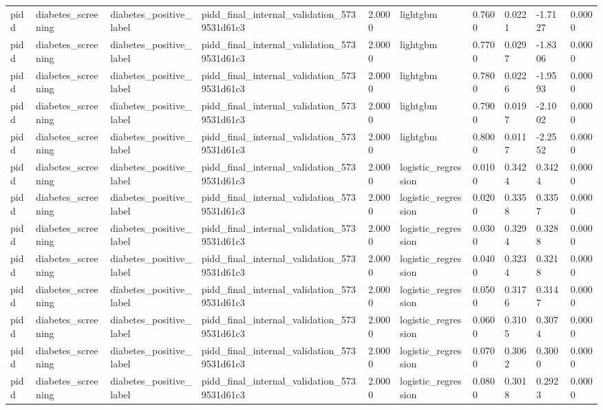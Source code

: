 \begin{tabular}{llllllllll}
pidd & diabetes\_screening & diabetes\_positive\_label & pidd\_final\_internal\_validation\_5739531d61c3 & 2.0000 & lightgbm & 0.7600 & 0.0221 & -1.7127 & 0.0000 \\
pidd & diabetes\_screening & diabetes\_positive\_label & pidd\_final\_internal\_validation\_5739531d61c3 & 2.0000 & lightgbm & 0.7700 & 0.0297 & -1.8306 & 0.0000 \\
pidd & diabetes\_screening & diabetes\_positive\_label & pidd\_final\_internal\_validation\_5739531d61c3 & 2.0000 & lightgbm & 0.7800 & 0.0226 & -1.9593 & 0.0000 \\
pidd & diabetes\_screening & diabetes\_positive\_label & pidd\_final\_internal\_validation\_5739531d61c3 & 2.0000 & lightgbm & 0.7900 & 0.0197 & -2.1002 & 0.0000 \\
pidd & diabetes\_screening & diabetes\_positive\_label & pidd\_final\_internal\_validation\_5739531d61c3 & 2.0000 & lightgbm & 0.8000 & 0.0117 & -2.2552 & 0.0000 \\
pidd & diabetes\_screening & diabetes\_positive\_label & pidd\_final\_internal\_validation\_5739531d61c3 & 2.0000 & logistic\_regression & 0.0100 & 0.3424 & 0.3424 & 0.0000 \\
pidd & diabetes\_screening & diabetes\_positive\_label & pidd\_final\_internal\_validation\_5739531d61c3 & 2.0000 & logistic\_regression & 0.0200 & 0.3358 & 0.3357 & 0.0000 \\
pidd & diabetes\_screening & diabetes\_positive\_label & pidd\_final\_internal\_validation\_5739531d61c3 & 2.0000 & logistic\_regression & 0.0300 & 0.3294 & 0.3288 & 0.0000 \\
pidd & diabetes\_screening & diabetes\_positive\_label & pidd\_final\_internal\_validation\_5739531d61c3 & 2.0000 & logistic\_regression & 0.0400 & 0.3234 & 0.3218 & 0.0000 \\
pidd & diabetes\_screening & diabetes\_positive\_label & pidd\_final\_internal\_validation\_5739531d61c3 & 2.0000 & logistic\_regression & 0.0500 & 0.3176 & 0.3147 & 0.0000 \\
pidd & diabetes\_screening & diabetes\_positive\_label & pidd\_final\_internal\_validation\_5739531d61c3 & 2.0000 & logistic\_regression & 0.0600 & 0.3105 & 0.3074 & 0.0000 \\
pidd & diabetes\_screening & diabetes\_positive\_label & pidd\_final\_internal\_validation\_5739531d61c3 & 2.0000 & logistic\_regression & 0.0700 & 0.3062 & 0.3000 & 0.0000 \\
pidd & diabetes\_screening & diabetes\_positive\_label & pidd\_final\_internal\_validation\_5739531d61c3 & 2.0000 & logistic\_regression & 0.0800 & 0.3018 & 0.2923 & 0.0000 \\

\end{tabular}
